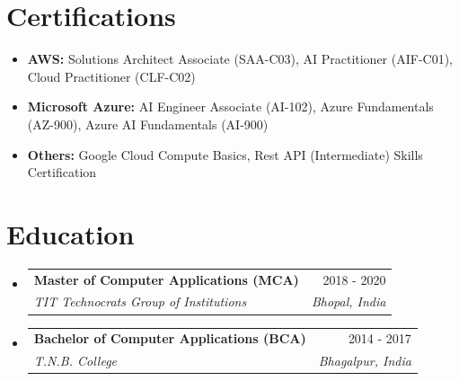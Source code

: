 \documentclass[letterpaper,11pt]{article}
\makeatletter
\newcommand{\resumeItem}[1]{
  \item\small{
    {#1 \vspace{-2pt}}
  }
}
\newcommand{\resumeSubheading}[4]{
  \vspace{-1pt}\item
    \begin{tabular*}{0.97\textwidth}[t]{l@{\extracolsep{\fill}}r}
      \textbf{#1} & #2 \\
      \textit{\small#3} & \textit{\small #4} \\
    \end{tabular*}\vspace{-5pt}
}
\newcommand{\resumeSubItem}[1]{\resumeItem{#1}\vspace{-4pt}}
\newcommand{\resumeSubHeadingListStart}{\begin{itemize}[leftmargin=0.15in, label={}]}
\newcommand{\resumeSubHeadingListEnd}{\end{itemize}}
\makeatother
\begin{document}
\section{Certifications}
    \resumeSubHeadingListStart
      \resumeSubItem{\textbf{AWS:} Solutions Architect Associate (SAA-C03), AI Practitioner (AIF-C01), Cloud Practitioner (CLF-C02)}
      \resumeSubItem{\textbf{Microsoft Azure:} AI Engineer Associate (AI-102), Azure Fundamentals (AZ-900), Azure AI Fundamentals (AI-900)}
      \resumeSubItem{\textbf{Others:} Google Cloud Compute Basics, Rest API (Intermediate) Skills Certification}
    \resumeSubHeadingListEnd


\section{Education}
  \resumeSubHeadingListStart
    \resumeSubheading
      {Master of Computer Applications (MCA)}{2018 - 2020}
      {TIT Technocrats Group of Institutions}{Bhopal, India}
    \resumeSubheading
      {Bachelor of Computer Applications (BCA)}{2014 - 2017}
      {T.N.B. College}{Bhagalpur, India}
  \resumeSubHeadingListEnd
\end{document}
